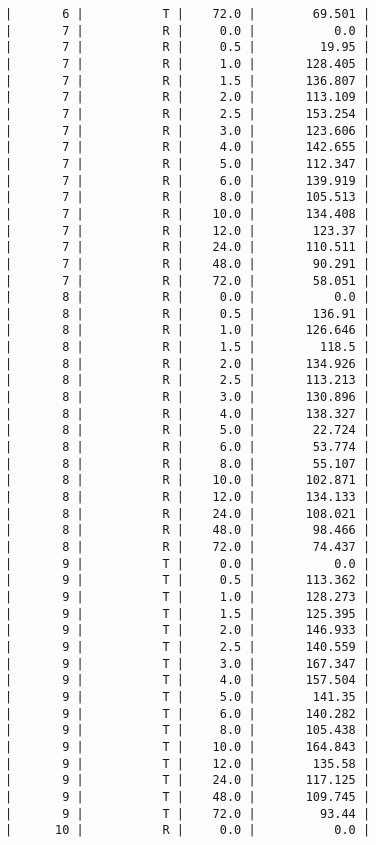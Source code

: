 \documentclass[12pt,a4paper]{article}
\begin{document}
\begin{lstlisting}
|       6 |           T |    72.0 |        69.501 |
|       7 |           R |     0.0 |           0.0 |
|       7 |           R |     0.5 |         19.95 |
|       7 |           R |     1.0 |       128.405 |
|       7 |           R |     1.5 |       136.807 |
|       7 |           R |     2.0 |       113.109 |
|       7 |           R |     2.5 |       153.254 |
|       7 |           R |     3.0 |       123.606 |
|       7 |           R |     4.0 |       142.655 |
|       7 |           R |     5.0 |       112.347 |
|       7 |           R |     6.0 |       139.919 |
|       7 |           R |     8.0 |       105.513 |
|       7 |           R |    10.0 |       134.408 |
|       7 |           R |    12.0 |        123.37 |
|       7 |           R |    24.0 |       110.511 |
|       7 |           R |    48.0 |        90.291 |
|       7 |           R |    72.0 |        58.051 |
|       8 |           R |     0.0 |           0.0 |
|       8 |           R |     0.5 |        136.91 |
|       8 |           R |     1.0 |       126.646 |
|       8 |           R |     1.5 |         118.5 |
|       8 |           R |     2.0 |       134.926 |
|       8 |           R |     2.5 |       113.213 |
|       8 |           R |     3.0 |       130.896 |
|       8 |           R |     4.0 |       138.327 |
|       8 |           R |     5.0 |        22.724 |
|       8 |           R |     6.0 |        53.774 |
|       8 |           R |     8.0 |        55.107 |
|       8 |           R |    10.0 |       102.871 |
|       8 |           R |    12.0 |       134.133 |
|       8 |           R |    24.0 |       108.021 |
|       8 |           R |    48.0 |        98.466 |
|       8 |           R |    72.0 |        74.437 |
|       9 |           T |     0.0 |           0.0 |
|       9 |           T |     0.5 |       113.362 |
|       9 |           T |     1.0 |       128.273 |
|       9 |           T |     1.5 |       125.395 |
|       9 |           T |     2.0 |       146.933 |
|       9 |           T |     2.5 |       140.559 |
|       9 |           T |     3.0 |       167.347 |
|       9 |           T |     4.0 |       157.504 |
|       9 |           T |     5.0 |        141.35 |
|       9 |           T |     6.0 |       140.282 |
|       9 |           T |     8.0 |       105.438 |
|       9 |           T |    10.0 |       164.843 |
|       9 |           T |    12.0 |        135.58 |
|       9 |           T |    24.0 |       117.125 |
|       9 |           T |    48.0 |       109.745 |
|       9 |           T |    72.0 |         93.44 |
|      10 |           R |     0.0 |           0.0 |

\end{lstlisting}
\end{document}
